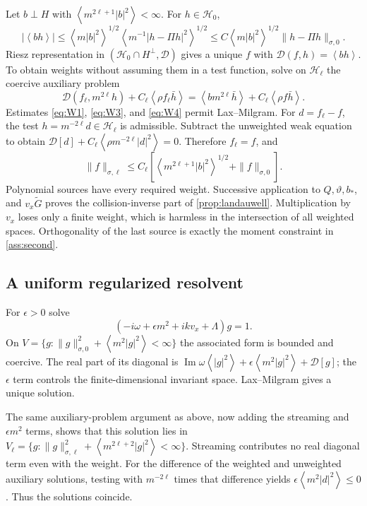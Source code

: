 \documentclass[11pt]{article}
\newcommand{\av}[1]{\left\langle #1\right\rangle}
\newcommand{\D}{\mathcal D}
\newcommand{\HH}{\mathcal H}
\newcommand{\Imag}{\operatorname{Im}}
\theoremstyle{definition}
\theoremstyle{remark}
\numberwithin{equation}{section}
\begin{document}
Let $b\perp H$ with $\av{m^{2\ell+1}|b|^2}<\infty$.
For $h\in\HH_0$,
\[
 |\av{bh}|\leq \av{m|b|^2}^{1/2}
     \av{m^{-1}|h-\Pi h|^2}^{1/2}
 \leq C\av{m|b|^2}^{1/2}\|h-\Pi h\|_{\sigma,0}.
\]
Riesz representation in $(\HH_0\cap H^\perp,\D)$ gives a
unique $f$ with $\D(f,h)=\av{bh}$.
To obtain weights without assuming them in a test function, solve
on $\HH_\ell$ the coercive auxiliary problem
\[
 \D(f_\ell,m^{2\ell}h)+C_\ell\av{\rho f_\ell\bar h}
 =\av{b m^{2\ell}\bar h}+C_\ell\av{\rho f\bar h}.
\]
Estimates \eqref{eq:W1}, \eqref{eq:W3}, and \eqref{eq:W4} permit
Lax--Milgram. For $d=f_\ell-f$, the test
$h=m^{-2\ell}d\in\HH_\ell$ is admissible.
Subtract the unweighted weak equation to obtain
$\D[d]+C_\ell\av{\rho m^{-2\ell}|d|^2}=0$.
Therefore $f_\ell=f$, and
\[
 \|f\|_{\sigma,\ell}\leq C_\ell\left[
        \av{m^{2\ell+1}|b|^2}^{1/2}+\|f\|_{\sigma,0}\right].
\]
Polynomial sources have every required weight. Successive application
to $Q,\vartheta,b_*$, and $v_x\widetilde G$ proves the collision-inverse
part of \cref{prop:landauwell}. Multiplication by $v_x$ loses only
a finite weight, which is harmless in the intersection of all
weighted spaces. Orthogonality of the last source is exactly the
moment constraint in \cref{ass:second}.

\subsection{A uniform regularized resolvent}

For $\epsilon>0$ solve
\begin{equation}
 (-i\omega+\epsilon m^2+ikv_x+\Lambda)g=1.
 \label{eq:regularized}
\end{equation}
On $V=\{g:\|g\|_{\sigma,0}^2+\av{m^2|g|^2}<\infty\}$ the
associated form is bounded and coercive. The real part of its diagonal
is
$\Imag\omega\av{|g|^2}+\epsilon\av{m^2|g|^2}+\D[g]$;
the $\epsilon$ term controls the finite-dimensional invariant space.
Lax--Milgram gives a unique solution.

The same auxiliary-problem argument as above, now adding the streaming
and $\epsilon m^2$ terms, shows that this solution lies in
$V_\ell=\{g:\|g\|_{\sigma,\ell}^2+\av{m^{2\ell+2}|g|^2}<\infty\}$.
Streaming contributes no real diagonal term even with the weight.
For the difference of the weighted and unweighted auxiliary solutions,
testing with $m^{-2\ell}$ times that difference yields
$\epsilon\av{m^2|d|^2}\leq0$. Thus the solutions coincide.
\end{document}
